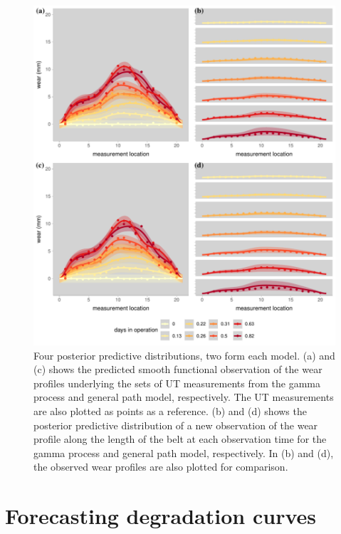 \begin{figure}
  \centering
  \includegraphics[width=\textwidth]{figures/ch-6/post_pred_belt_wear.pdf}
  \caption{Four posterior predictive distributions, two form each model. (a) and (c) shows the predicted smooth functional observation of the wear profiles underlying the sets of UT measurements from the gamma process and general path model, respectively. The UT measurements are also plotted as points as a reference. (b) and (d) shows the posterior predictive distribution of a new observation of the wear profile along the length of the belt at each observation time for the gamma process and general path model, respectively. In (b) and (d), the observed wear profiles are also plotted for comparison.}
  \label{fig:post-pred-dists-beltwear}
\end{figure}

\section{Forecasting degradation curves} \label{sec:belt-wear-forecast}

